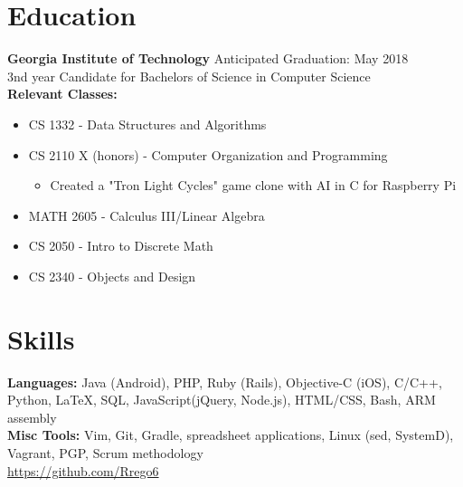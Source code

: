 \documentclass[line, margin]{res}
\begin{document}

\address{402 Roberts Way \\ Rincon, GA 31326 \\ (912) 346 6060\\ \href{mailto:rrego@gatech.edu}{\textbf{rrego@gatech.edu}}}

\begin{resume}

\section{Education}
\textbf{Georgia Institute of Technology} \hfill Anticipated Graduation: May 2018 \\
3nd year Candidate for Bachelors of Science in Computer Science \\
\textbf{Relevant Classes:}
\begin{itemize}
	\item CS 1332 - Data Structures and Algorithms
	\item CS 2110 X (honors) - Computer Organization and Programming
		\begin{itemize}
			\item Created a "Tron Light Cycles" game clone with AI in C for Raspberry Pi
		\end{itemize}
	\item MATH 2605 - Calculus III/Linear Algebra
	\item CS 2050 - Intro to Discrete Math
	\item CS 2340 - Objects and Design
\end{itemize}


\section{Skills}
\textbf{Languages:} Java (Android), PHP, Ruby (Rails), Objective-C (iOS), C/C++, Python, LaTeX, SQL, JavaScript(jQuery, Node.js), HTML/CSS, Bash, ARM assembly \\
\textbf{Misc Tools:} Vim, Git, Gradle, spreadsheet applications, Linux (sed, SystemD), Vagrant, PGP, Scrum methodology\\
\url{https://github.com/Rrego6}


\end{resume}
\end{document}
